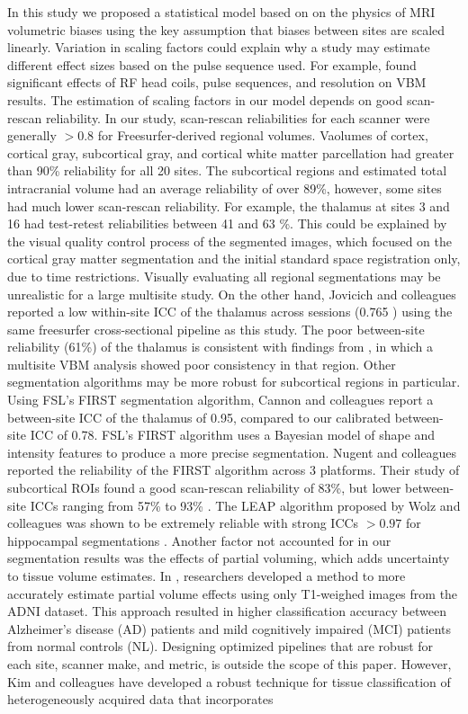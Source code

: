In this study we proposed a statistical model based on on the physics of MRI volumetric biases using the key assumption that biases between sites are scaled linearly. Variation in scaling factors could explain why a study may estimate different effect sizes based on the pulse sequence used. For example, \cite{streitburger2014impact} found significant effects of RF head coils, pulse sequences, and resolution on VBM results. The estimation of scaling factors in our model depends on good scan-rescan reliability. In our study, scan-rescan reliabilities for each scanner were generally $>0.8$ for Freesurfer-derived regional volumes. Vaolumes of cortex, cortical gray, subcortical gray, and cortical white matter parcellation had greater than 90\% reliability for all 20 sites. The subcortical regions and estimated total intracranial volume had an average reliability of over 89\%, however, some sites had much lower scan-rescan reliability. For example, the thalamus at sites 3 and 16 had test-retest reliabilities between 41 and 63 \%. This could be explained by the visual quality control process of the segmented images, which focused on the cortical gray matter segmentation and the initial standard space registration only, due to time restrictions. Visually evaluating all regional segmentations may be unrealistic for a large multisite study. On the other hand, Jovicich and colleagues \cite{jovicich2013brain} reported a low within-site ICC of the thalamus across sessions (0.765 ) using the same freesurfer cross-sectional pipeline as this study. The poor between-site reliability (61\%) of the thalamus is consistent with findings from \cite{schnack2010mapping}, in which a multisite VBM analysis showed poor consistency in that region. Other segmentation algorithms may be more robust for subcortical regions in particular. Using FSL's FIRST segmentation algorithm, Cannon and colleagues \cite{cannon2014} report a between-site ICC of the thalamus of 0.95, compared to our calibrated between-site ICC of 0.78. FSL's FIRST algorithm \cite{firstcitation} uses a Bayesian model of shape and intensity features to produce a more precise segmentation. Nugent and colleagues reported the reliability of the FIRST algorithm across 3 platforms. Their study of subcortical ROIs found a good scan-rescan reliability of 83\%, but lower between-site ICCs ranging from 57\% to 93\% \cite{firstreliability}. The LEAP algorithm proposed by Wolz and colleagues \cite{Wolz_2010} was shown to be extremely reliable with strong ICCs $>0.97$ for hippocampal segmentations \cite{Wolz_2014}. Another factor not accounted for in our segmentation results was the effects of partial voluming, which adds uncertainty to tissue volume estimates. In \cite{Roche_2014}, researchers developed a method to more accurately estimate partial volume effects using only T1-weighed images from the ADNI dataset. This approach resulted in higher classification accuracy between Alzheimer's disease (AD) patients and mild cognitively impaired (MCI) patients from normal controls (NL). Designing optimized pipelines that are robust for each site, scanner make, and metric, is outside the scope of this paper. However, Kim and colleagues have developed a robust technique for tissue classification of heterogeneously acquired data that incorporates 
